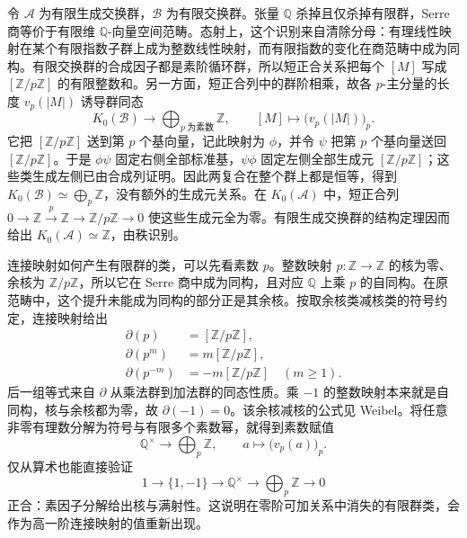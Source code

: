 令 \(\mathcal A\) 为有限生成交换群，\(\mathcal B\) 为有限交换群。张量 \(\mathbb Q\) 杀掉且仅杀掉有限群，Serre 商等价于有限维 \(\mathbb Q\)-向量空间范畴。态射上，这个识别来自清除分母：有理线性映射在某个有限指数子群上成为整数线性映射，而有限指数的变化在商范畴中成为同构。有限交换群的合成因子都是素阶循环群，所以短正合关系把每个 \([M]\) 写成 \([\mathbb Z/p\mathbb Z]\) 的有限整数和。另一方面，短正合列中的群阶相乘，故各 \(p\)-主分量的长度 \(v_p(|M|)\) 诱导群同态
\[
	K_0(\mathcal B)\longrightarrow\bigoplus_{p\;\text{为素数}}\mathbb Z, \qquad [M]\longmapsto\bigl(v_p(|M|)\bigr)_p.
\]
它把 \([\mathbb Z/p\mathbb Z]\) 送到第 \(p\) 个基向量，记此映射为 \(\phi\)，并令 \(\psi\) 把第 \(p\) 个基向量送回 \([\mathbb Z/p\mathbb Z]\)。于是 \(\phi\psi\) 固定右侧全部标准基，\(\psi\phi\) 固定左侧全部生成元 \([\mathbb Z/p\mathbb Z]\)；这些类生成左侧已由合成列证明。因此两复合在整个群上都是恒等，得到 \(K_0(\mathcal B)\simeq\bigoplus_p\mathbb Z\)，没有额外的生成元关系。在 \(K_0(\mathcal A)\) 中，短正合列 \(0\rightarrow\mathbb Z\xrightarrow{p}\mathbb Z\rightarrow\mathbb Z/p\mathbb Z\rightarrow0\) 使这些生成元全为零。有限生成交换群的结构定理因而给出 \(K_0(\mathcal A)\simeq\mathbb Z\)，由秩识别。

\ProseParagraphBreak
连接映射如何产生有限群的类，可以先看素数 \(p\)。整数映射 \(p:\mathbb Z\to\mathbb Z\) 的核为零、余核为 \(\mathbb Z/p\mathbb Z\)，所以它在 Serre 商中成为同构，且对应 \(\mathbb Q\) 上乘 \(p\) 的自同构。在原范畴中，这个提升未能成为同构的部分正是其余核。按取余核类减核类的符号约定，连接映射给出
\[
	\begin{aligned}
		\partial(p)&=[\mathbb Z/p\mathbb Z],\\
		\partial(p^m)&=m[\mathbb Z/p\mathbb Z],\\
		\partial(p^{-m})&=-m[\mathbb Z/p\mathbb Z]\quad(m\ge1).
	\end{aligned}
\]
后一组等式来自 \(\partial\) 从乘法群到加法群的同态性质。乘 \(-1\) 的整数映射本来就是自同构，核与余核都为零，故 \(\partial(-1)=0\)。该余核减核的公式见 Weibel\cite[Chapter V, Application 6.1 and Example 6.1.2]{Weibel2013KBook}。将任意非零有理数分解为符号与有限多个素数幂，就得到素数赋值
\[
	\mathbb Q^\times\longrightarrow\bigoplus_p\mathbb Z, \qquad a\longmapsto\bigl(v_p(a)\bigr)_p.
\]
仅从算术也能直接验证
\[
	1\longrightarrow\{1,-1\}\longrightarrow\mathbb Q^\times \longrightarrow\bigoplus_p\mathbb Z\longrightarrow0
\]
正合：素因子分解给出核与满射性。这说明在零阶可加关系中消失的有限群类，会作为高一阶连接映射的值重新出现。

